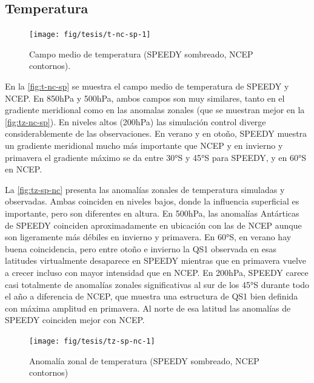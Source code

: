 \documentclass[spanish,a4paper,12pt,oneside]{book}
\begin{document}
\subsection{Temperatura}\label{temperatura-1}

\begin{landscape}\begin{figure}

{\centering \texttt{[image: fig/tesis/t-nc-sp-1]} 

}

\caption{Campo medio de temperatura (SPEEDY sombreado, NCEP contornos).}\label{fig:t-nc-sp}
\end{figure}
\end{landscape}

En la \autoref{fig:t-nc-sp} se muestra el campo medio de temperatura de
SPEEDY y NCEP. En 850hPa y 500hPa, ambos campos son muy similares, tanto
en el gradiente meridional como en las anomalas zonales (que se muestran
mejor en la \autoref{fig:tz-nc-sp}). En niveles altos (200hPa) las
simulación control diverge considerablemente de las observaciones. En
verano y en otoño, SPEEDY muestra un gradiente meridional mucho más
importante que NCEP y en invierno y primavera el gradiente máximo se da
entre 30°S y 45°S para SPEEDY, y en 60°S en NCEP.

La \autoref{fig:tz-sp-nc} presenta las anomalías zonales de temperatura
simuladas y observadas. Ambas coinciden en niveles bajos, donde la
influencia superficial es importante, pero son diferentes en altura. En
500hPa, las anomalías Antárticas de SPEEDY coinciden aproximadamente en
ubicación con las de NCEP aunque son ligeramente más débiles en invierno
y primavera. En 60°S, en verano hay buena coincidencia, pero entre otoño
e invierno la QS1 observada en esas latitudes virtualmente desaparece en
SPEEDY mientras que en primavera vuelve a crecer incluso con mayor
intensidad que en NCEP. En 200hPa, SPEEDY carece casi totalmente de
anomalías zonales significativas al sur de los 45°S durante todo el año
a diferencia de NCEP, que muestra una estructura de QS1 bien definida
con máxima amplitud en primavera. Al norte de esa latitud las anomalías
de SPEEDY coinciden mejor con NCEP.

\begin{landscape}\begin{figure}

{\centering \texttt{[image: fig/tesis/tz-sp-nc-1]} 

}

\caption{Anomalía zonal de temperatura (SPEEDY sombreado, NCEP contornos)}\label{fig:tz-sp-nc}
\end{figure}
\end{landscape}
\end{document}
